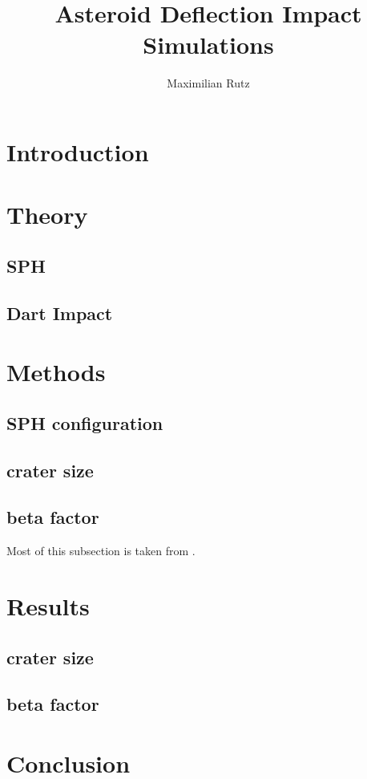 \documentclass{article}
\title{Asteroid Deflection Impact Simulations}
\author{Maximilian Rutz}
\date{}
\begin{document}
	\maketitle
	\begin{abstract}
	 
	\end{abstract}
	
	\newpage
	\tableofcontents
	 
	\newpage
	\section{Introduction} 
	\section{Theory}
		\subsection{SPH}
		\subsection{Dart Impact}
	\section{Methods}
		\subsection{SPH configuration}
		\subsection{crater size}
		\subsection{beta factor}
		Most of this subsection is taken from \cite{Jutzi_p_alpha_1}.		 
	\section{Results}
		\subsection{crater size}
		\subsection{beta factor}
	\section{Conclusion}
	
	\newpage 
	\printbibliography
 
\end{document}
